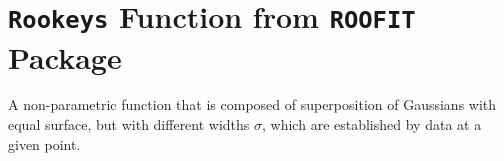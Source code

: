 
\section{\texttt{Rookeys} Function from \texttt{ROOFIT} Package}
\label{RK}
A non-parametric function that is composed of superposition of Gaussians with equal surface, but with different widths $\sigma$, which are established by data at a given point.



